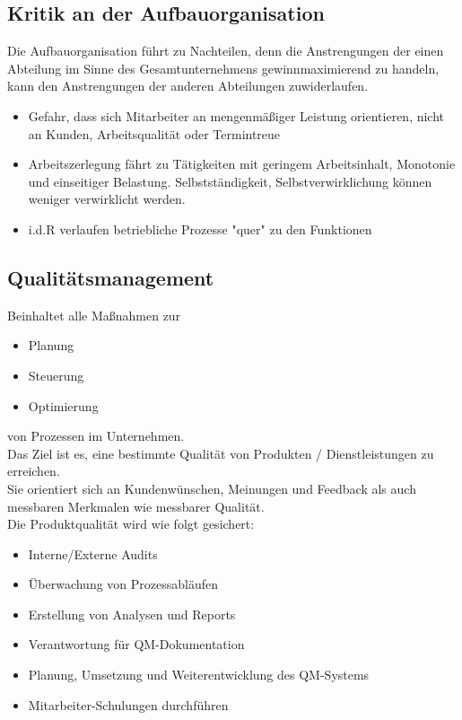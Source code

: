 \documentclass[10pt]{article}
\begin{document}
\subsection{Kritik an der Aufbauorganisation}
Die Aufbauorganisation führt zu Nachteilen, denn die Anstrengungen der einen Abteilung im Sinne des Gesamtunternehmens gewinnmaximierend zu handeln, kann den Anstrengungen der anderen Abteilungen zuwiderlaufen.
\begin{itemize}
\item Gefahr, dass sich Mitarbeiter an mengenmäßiger Leistung orientieren, nicht an Kunden, Arbeitsqualität oder Termintreue
\item Arbeitszerlegung fährt zu Tätigkeiten mit geringem Arbeitsinhalt, Monotonie und einseitiger Belastung. Selbstst\"andigkeit, Selbstverwirklichung k\"onnen weniger verwirklicht werden.
\item i.d.R verlaufen betriebliche Prozesse "quer" zu den Funktionen
\end{itemize}

\subsection{Qualitätsmanagement}
Beinhaltet alle Maßnahmen zur
\begin{itemize}
\item Planung
\item Steuerung
\item Optimierung
\end{itemize}
von Prozessen im Unternehmen. \\
Das Ziel ist es, eine bestimmte Qualität von Produkten /  Dienstleistungen zu erreichen. \\
Sie orientiert sich an Kundenwünschen, Meinungen und Feedback als auch messbaren  Merkmalen wie messbarer Qualit\"at.  \\
Die Produktqualität wird wie folgt gesichert:
\begin{itemize}
\item Interne/Externe Audits
\item \"Uberwachung von Prozessabl\"aufen
\item Erstellung von Analysen und Reports
\item Verantwortung für QM-Dokumentation
\item Planung, Umsetzung und Weiterentwicklung des QM-Systems
\item Mitarbeiter-Schulungen durchführen
\end{itemize}
\end{document}
